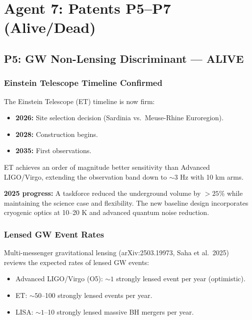 \documentclass[11pt]{article}
\begin{document}
\section{Agent 7: Patents P5--P7 (Alive/Dead)}

\subsection{P5: GW Non-Lensing Discriminant --- ALIVE}

\subsubsection{Einstein Telescope Timeline Confirmed}

The Einstein Telescope (ET) timeline is now firm:
\begin{itemize}
  \item \textbf{2026:} Site selection decision (Sardinia vs.\
    Meuse-Rhine Euroregion).
  \item \textbf{2028:} Construction begins.
  \item \textbf{2035:} First observations.
\end{itemize}

ET achieves an order of magnitude better sensitivity than Advanced
LIGO/Virgo, extending the observation band down to $\sim 3$ Hz with
10 km arms.

\textbf{2025 progress:} A taskforce reduced the underground volume
by $> 25\%$ while maintaining the science case and flexibility.
The new baseline design incorporates cryogenic optics at 10--20 K
and advanced quantum noise reduction.

\subsubsection{Lensed GW Event Rates}

Multi-messenger gravitational lensing (arXiv:2503.19973, Saha et al.\
2025) reviews the expected rates of lensed GW events:
\begin{itemize}
  \item Advanced LIGO/Virgo (O5): $\sim 1$ strongly lensed event
    per year (optimistic).
  \item ET: $\sim 50$--100 strongly lensed events per year.
  \item LISA: $\sim 1$--10 strongly lensed massive BH mergers per year.
\end{itemize}
\end{document}
